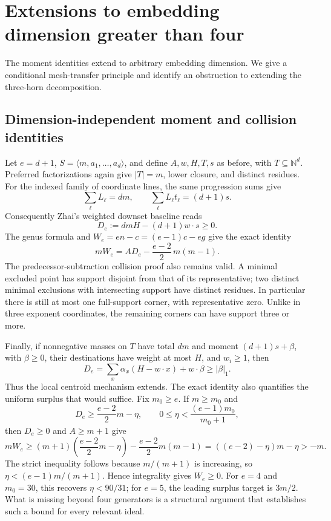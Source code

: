 \section{Extensions to embedding dimension greater than four}
\label{sec:extensions}

The moment identities extend to arbitrary embedding dimension. We give a
conditional mesh-transfer principle and identify an obstruction to extending
the three-horn decomposition.

\subsection{Dimension-independent moment and collision identities}

Let \(e=d+1\), \(S=\langle m,a_1,\ldots,a_d\rangle\), and define
\(A,w,H,T,s\) as before, with \(T\subseteq\mathbb N^d\). Preferred
factorizations again give \(|T|=m\), lower closure, and distinct residues.
For the indexed family of coordinate lines, the same progression sums give
\[
\sum_\ell L_\ell=dm,\qquad
\sum_\ell L_\ell t_\ell=(d+1)s.
\]
Consequently Zhai's weighted downset baseline \cite{Z} reads
\[
D_e:=dmH-(d+1)w\cdot s\ge0.
\]
The genus formula and \(W_e=en-c=(e-1)c-eg\) give the exact identity
\begin{equation}\label{eq:extension-moment}
mW_e=A D_e-\frac{e-2}{2}\,m(m-1).
\end{equation}
The predecessor-subtraction collision proof also remains valid. A minimal
excluded point has support disjoint from that of its representative; two
distinct minimal exclusions with intersecting support have distinct
residues. In particular there is still at most one full-support corner,
with representative zero. Unlike in three exponent coordinates, the
remaining corners can have support three or more.

Finally, if nonnegative masses on \(T\) have total \(dm\) and moment
\((d+1)s+\beta\), with \(\beta\ge0\), their destinations have weight
at most \(H\), and \(w_i\ge1\), then
\[
D_e=\sum_x\alpha_x(H-w\cdot x)+w\cdot\beta\ge|\beta|_1.
\]
Thus the local centroid mechanism extends. The exact identity also quantifies
the uniform surplus that would suffice. Fix \(m_0\ge e\). If \(m\ge m_0\) and
\[
D_e\ge\frac{e-2}{2}m-\eta,
\qquad 0\le\eta<\frac{(e-1)m_0}{m_0+1},
\]
then \(D_e\ge0\) and \(A\ge m+1\) give
\[
mW_e\ge(m+1)\left(\frac{e-2}{2}m-\eta\right)
       -\frac{e-2}{2}m(m-1)
=((e-2)-\eta)m-\eta>-m.
\]
The strict inequality follows because \(m/(m+1)\) is increasing, so
\(\eta<(e-1)m/(m+1)\). Hence integrality gives \(W_e\ge0\). For \(e=4\)
and \(m_0=30\), this recovers \(\eta<90/31\); for \(e=5\), the leading
surplus target is \(3m/2\). What is missing beyond four generators is a
structural argument that establishes such a bound for every relevant ideal.

